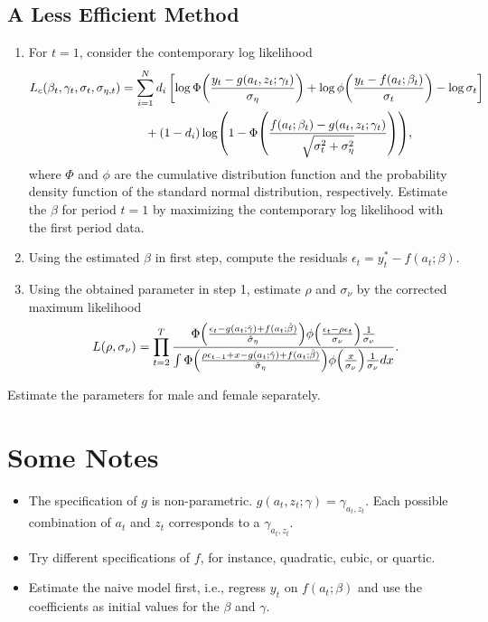 \documentclass[a4paper, 12pt]{article}
\begin{document}
\subsection{A Less Efficient Method}
\begin{enumerate}
    \item For $t = 1$, consider the contemporary log likelihood 
    \begin{equation*}
        \begin{split}
            L_c(\beta_t,\gamma_t,\sigma_t,\sigma_{\eta,t}) &= \sum_{i=1}^N d_i\sbrc{\log\Phi\pth{\frac{y_t - g(a_t,z_t;\gamma_t)}{\sigma_\eta}} + \log\phi\pth{\frac{y_t - f(a_t;\beta_t)}{\sigma_t}} - \log\sigma_t} \\
            &\qquad + (1 - d_i)\log\pth{1 - \Phi\pth{\frac{f(a_t;\beta_t) - g(a_t,z_t;\gamma_t)}{\sqrt{\sigma_t^2 + \sigma_\eta^2}}}},
        \end{split}
    \end{equation*}
    where $\Phi$ and $\phi$ are the cumulative distribution function and the probability 
    density function of the standard normal distribution, respectively. Estimate the 
    $\beta$ for period $t = 1$ by maximizing the contemporary log likelihood with the first 
    period data.  
    \item Using the estimated $\beta$ in first step, compute the residuals $\epsilon_t = y_t^* - f(a_t;\beta)$. 
    \item Using the obtained parameter in step 1, estimate $\rho$ and $\sigma_\nu$ by the corrected maximum likelihood 
    \begin{equation*}
        L(\rho, \sigma_\nu) = \prod_{t=2}^{T}\frac{\Phi\pth{\frac{\epsilon_t - g(a_t;\hat{\gamma}) + f(a_t;\hat{\beta})}{\hat{\sigma}_\eta}}\phi\pth{\frac{\epsilon_t - \rho\epsilon_t}{\sigma_\nu}}\frac{1}{\sigma_\nu}}{\int \Phi\pth{\frac{\rho\epsilon_{t-1} + x - g(a_t;\hat{\gamma}) + f(a_t;\hat{\beta})}{\hat{\sigma}_\eta}}\phi\pth{\frac{x}{\sigma_\nu}}\frac{1}{\sigma_\nu}dx}.
    \end{equation*}
\end{enumerate}
Estimate the parameters for male and female separately. 

\section{Some Notes}
\begin{itemize}
    \item The specification of $g$ is non-parametric. $g(a_t,z_t;\gamma) = \gamma_{a_t,z_t}$. Each possible 
    combination of $a_t$ and $z_t$ corresponds to a $\gamma_{a_t,z_t}$.
    \item Try different specifications of $f$, for instance, quadratic, cubic, or quartic. 
    \item Estimate the naive model first, i.e., regress $y_t$ on $f(a_t;\beta)$ and use 
    the coefficients as initial values for the $\beta$ and $\gamma$. 
\end{itemize}

%
%
\end{document}
